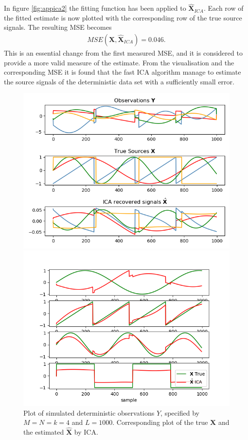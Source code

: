 In figure \ref{fig:appica2} the fitting function has been applied to $\hat{\textbf{X}}_{ICA}$. Each row of the fitted estimate is now plotted with the corresponding row of the true source signals. 
The resulting MSE becomes 
\begin{align*}
MSE(\textbf{X},\hat{\textbf{X}}_{ICA}) = 0.046.
\end{align*}  
This is an essential change from the first measured MSE, and it is considered to provide a more valid measure of the estimate. From the visualisation and the corresponding MSE it is found that the fast ICA algorithm manage to estimate the source signals of the deterministic data set with a sufficiently small error. 
\begin{figure}[H]
    \begin{minipage}[t]{.45\textwidth}
		\centering
		\includegraphics[scale=0.45]{figures/ICAapp/ICA_app1.png}
	\caption{Plot of simulated deterministic observations $Y$, specified by $M=N=k=4$ and $L=1000$. Corresponding plot of the true $\textbf{X}$ and the estimated $\hat{\textbf{X}}$ by ICA.}
	\label{fig:appica1}
    \end{minipage} 
    \hfill
    \begin{minipage}[t]{.45\textwidth}
		\centering
		\includegraphics[scale=0.45]{figures/ICAapp/ICA_app2.png}

\end{minipage}
\end{figure}
